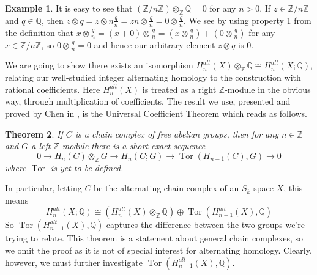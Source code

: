 \documentclass[11pt,a4paper,twoside]{article}
\theoremstyle{plain}
\newtheorem{thm}{Theorem}[subsection]
\theoremstyle{definition}
\theoremstyle{definition}
\theoremstyle{definition}
\theoremstyle{definition}
\newtheorem{example}[thm]{Example}
\theoremstyle{definition}
\DeclareMathOperator{\Tor}{Tor}
\begin{document}
\begin{example}
\label{Ex:ZtensorZmodnZ}
It is easy to see that $(\mathbb{Z}/n\mathbb{Z})\otimes_\mathbb{Z}\mathbb{Q}=0$ for any $n>0$. If $z\in\mathbb{Z}/n\mathbb{Z}$ and $q\in\mathbb{Q}$, then $z\otimes q=z\otimes n\frac qn=zn\otimes \frac qn=0\otimes \frac qn$. We see by using property 1 from the definition that $x\otimes \frac qn=(x+0)\otimes \frac qn = (x\otimes \frac qn) + (0\otimes \frac qn)$ for any $x\in\mathbb{Z}/n\mathbb{Z}$, so $0\otimes\frac qn=0$ and hence our arbitrary element $z\otimes q$ is $0$.
\end{example}

We are going to show there exists an isomorphism $H^{alt}_n(X)\otimes_\mathbb{Z}\mathbb{Q}\cong H^{alt}_n(X;\mathbb{Q})$, relating our well-studied integer alternating homology to the construction with rational coefficients. Here $H_n^{alt}(X)$ is treated as a right $\mathbb{Z}$-module in the obvious way, through multiplication of coefficients. The result we use, presented and proved by Chen in \cite{UCT}, is the Universal Coefficient Theorem which reads as follows.

\vspace{2mm}
\begin{thm}\label{Thm:UCT}
If $C$ is a chain complex of free abelian groups, then for any $n\in\mathbb{Z}$ and $G$ a left $\mathbb{Z}$-module there is a short exact sequence
$$ 0\longrightarrow H_n(C)\otimes_\mathbb{Z}G\longrightarrow H_n(C;G)\longrightarrow \Tor(H_{n\!-\!1}(C),G)\longrightarrow 0$$
where $\Tor$ is yet to be defined.
\end{thm}
In particular, letting $C$ be the alternating chain complex of an $S_k$-space $X$, this means 
$$H^{alt}_n(X;\mathbb{Q})\cong (H_n^{alt}(X)\otimes_\mathbb{Z}\mathbb{Q}) \oplus \Tor(H^{alt}_{n\!-\!1}(X),\mathbb{Q})$$
So $\Tor(H^{alt}_{n\!-\!1}(X),\mathbb{Q})$ captures the difference between the two groups we're trying to relate. This theorem is a statement about general chain complexes, so we omit the proof as it is not of special interest for alternating homology. Clearly, however, we must further investigate $\Tor(H^{alt}_{n\!-\!1}(X),\mathbb{Q})$.
\end{document}
